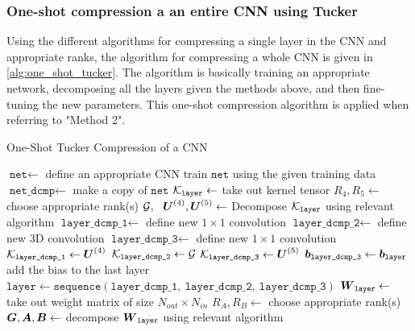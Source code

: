 \subsubsection{One-shot compression a an entire CNN using Tucker}
Using the different algorithms for compressing a single layer in the CNN and appropriate ranks, the algorithm for compressing a whole CNN is given in \autoref{alg:one_shot_tucker}. The algorithm is basically training an appropriate network, decomposing all the layers given the methods above, and then fine-tuning the new parameters. This one-shot compression algorithm is applied when referring to "Method 2".
\begin{algorithm} \caption{One-Shot Tucker Compression of a CNN} \label{alg:one_shot_tucker}
\begin{algorithmic}[1]
    \State $\texttt{net} \leftarrow $ define an appropriate CNN
    \State train $\texttt{net}$ using the given training data
    \State $\texttt{net\_dcmp} \leftarrow $ make a copy of $\texttt{net}$
        \State $\mathcal{K}_{\texttt{layer}} \leftarrow $ take out kernel tensor
        \State $R_4, R_5 \leftarrow$ choose appropriate rank(s)
        \State $\tensor{G}, \ \ \bs{U}^{(4)}, \bs{U}^{(5)} \leftarrow $ Decompose $\mathcal{K}_{\texttt{layer}}$ using relevant algorithm 
        \State $\texttt{layer\_dcmp\_1} \leftarrow $ define new $1\times 1$ convolution 
        \State $\texttt{layer\_dcmp\_2} \leftarrow $ define new 3D convolution
        \State $\texttt{layer\_dcmp\_3} \leftarrow $ define new $1\times 1$ convolution 
        \State $\mathcal{K}_{\texttt{layer\_dcmp\_1}} \leftarrow \boldsymbol{U}^{(4)}$ 
        \State $\mathcal{K}_{\texttt{layer\_dcmp\_2}} \leftarrow \mathcal{G}$
        \State $\mathcal{K}_{\texttt{layer\_dcmp\_3}} \leftarrow \boldsymbol{U}^{(5)}$ 
        \State $\boldsymbol{b}_{\texttt{layer\_dcmp\_3}} \leftarrow \boldsymbol{b}_{\texttt{layer}}$ add the bias to the last layer 
        \State $\texttt{layer} \leftarrow \texttt{sequence}(\texttt{layer\_dcmp\_1}, \  \texttt{layer\_dcmp\_2}, \ \texttt{layer\_dcmp\_3})$
    \EndFor
        \State $\boldsymbol{W}_{\texttt{layer}} \leftarrow $ take out weight matrix of size $N_{out} \times N_{in}$
        \State $R_A, R_B \leftarrow $ choose appropriate rank(s)
        \State $\boldsymbol{G}, \boldsymbol{A}, \boldsymbol{B} \leftarrow $ decompose $\boldsymbol{W}_{\texttt{layer}}$ using relevant algorithm 

\end{algorithmic}
\end{algorithm}
